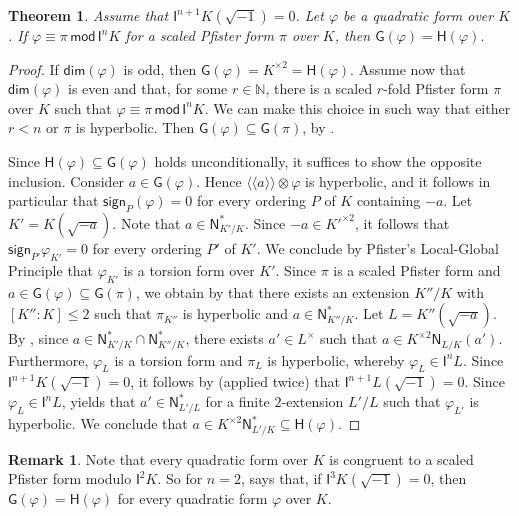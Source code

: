 \documentclass[twoside,11pt]{amsart}
\numberwithin{equation}{section}
\newtheorem{thm}[equation]{Theorem}
\theoremstyle{definition}
\newtheorem{rem}[equation]{Remark}
\renewcommand{\dim}{\operatorname{\mathsf{dim}}}
\renewcommand{\bmod}{\operatorname{\,\,\mathsf{mod}}\,\,}
\newcommand\N{\operatorname{N}}
\newcommand{\vf}{\varphi}
\newcommand{\mg}[1]{{#1}^{\times}}
\newcommand{\sq}[1]{{#1}^{\times 2}}
\newcommand{\nat}{\mathbb{N}}
\newcommand{\la}{\langle}
\newcommand{\ra}{\rangle}
\newcommand{\lla}{\la\!\la}
\newcommand{\rra}{\ra\!\ra}
\renewcommand{\leq}{\leqslant}
\newcommand{\I}{\mathsf{I}}
\renewcommand{\N}{\mathsf{N}}
\newcommand{\G}{\mathsf{G}}
\renewcommand{\H}{\mathsf{H}}
\renewcommand{\dim}{\mathsf{dim}}
\renewcommand{\leq}{\leqslant}
\newcommand{\sign}{\mathsf{sign}}
\renewcommand{\bmod}{\,\mathsf{mod}\,}
\begin{document}
\begin{thm}\label{T:In-G-H}
Assume that $\I^{n+1} K(\sqrt{-1})=0$.
Let $\varphi$ be a quadratic form over $K$. 
If $\varphi\equiv\pi\bmod \I^nK$ for a scaled Pfister form $\pi$ over $K$, then
$\G(\varphi)=\H(\varphi)$. 
\end{thm}
\begin{proof}
If $\dim(\vf)$ is odd, then $\G(\vf)=\sq{K}=\H(\vf)$.
Assume now that $\dim(\vf)$ is even and that, for some $r\in\nat$, there is a scaled $r$-fold Pfister form $\pi$ over $K$ such that
$\vf\equiv \pi \bmod\I^nK$.
We can make this choice in such way that either $r<n$ or $\pi$ is hyperbolic.
Then $\G(\vf)\subseteq\G(\pi)$, by .

Since $\H(\vf)\subseteq\G(\vf)$ holds unconditionally, it suffices to show the opposite inclusion.
Consider $a\in\G(\vf)$.
Hence $\lla a\rra\otimes \vf$ is hyperbolic, and it follows in particular that $\sign_P(\vf)=0$ for every ordering $P$ of $K$ containing $-a$.
Let $K'=K(\sqrt{-a})$. 
Note that $a\in\N^\ast_{K'/K}$. 
Since $-a\in\sq{K'}$, it follows that $\sign_{P'}\vf_{K'}=0$ for every ordering $P'$ of $K'$.
We conclude by Pfister's Local-Global Principle \cite[Chap.~VIII, Theorem 3.2]{Lam05} that $\vf_{K'}$ is a torsion form over $K'$.
Since $\pi$ is a scaled Pfister form and $a\in\G(\vf)\subseteq\G(\pi)$, we obtain by  that there exists an extension $K''/K$ with $[K'':K]\leq 2$ such that $\pi_{K''}$ is hyperbolic and $a\in\N_{K''/K}^\ast$.
Let $L=K''(\sqrt{-a})$. 
By , since $a\in\N^\ast_{K'/K}\cap \N^\ast_{K''/K}$, there exists $a'\in\mg{L}$ such that $a\in\sq{K}\N_{L/K}(a')$.
Furthermore, $\vf_{L}$ is a torsion form and $\pi_{L}$ is hyperbolic, whereby $\vf_{L}\in\I^{n}L$.
Since $\I^{n+1}K(\sqrt{-1})=0$, it follows by \cite[Cor.~35.8]{EKM08} (applied twice) that $\I^{n+1}L(\sqrt{-1})=0$.
Since $\vf_{L}\in\I^{n}L$,  yields that $a'\in\N_{L'/L}^\ast$ for a finite $2$-extension $L'/L$ such that $\vf_{L'}$ is hyperbolic.
We conclude that $a\in \sq{K}\N_{L'/K}^\ast\subseteq\H(\vf)$.
\end{proof}

\begin{rem}
Note that every quadratic form over $K$ is congruent to a scaled Pfister form modulo $\I^2K$.
So for $n=2$,  says that, if $\I^3K(\sqrt{-1})=0$, then $\G(\vf)=\H(\vf)$ for every quadratic form $\vf$ over $K$.
\end{rem}
\end{document}
